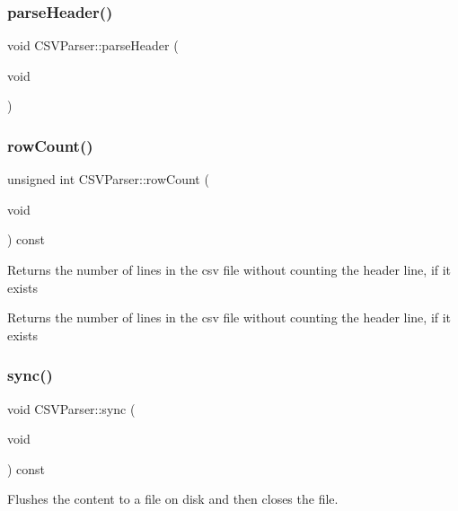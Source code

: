\mbox{\label{class_c_s_v_parser_a8b556e47ecfea188d4c6c630616f5667}} 
\subsubsection{\texorpdfstring{parseHeader()}{parseHeader()}}
{\footnotesize\ttfamily void C\+S\+V\+Parser\+::parse\+Header (\begin{DoxyParamCaption}\item[{void}]{ }\end{DoxyParamCaption})\hspace{0.3cm}{\ttfamily [protected]}}

\mbox{\label{class_c_s_v_parser_ab7596d8458539a585908d41638672f4c}} 
\subsubsection{\texorpdfstring{rowCount()}{rowCount()}}
{\footnotesize\ttfamily unsigned int C\+S\+V\+Parser\+::row\+Count (\begin{DoxyParamCaption}\item[{void}]{ }\end{DoxyParamCaption}) const}

Returns the number of lines in the csv file without counting the header line, if it exists \begin{DoxyReturn}{Returns}
the number of lines in the csv file without counting the header line, if it exists 
\end{DoxyReturn}
\mbox{\label{class_c_s_v_parser_aa0b2494094eb2ce657787ae830b3cc52}} 
\subsubsection{\texorpdfstring{sync()}{sync()}}
{\footnotesize\ttfamily void C\+S\+V\+Parser\+::sync (\begin{DoxyParamCaption}\item[{void}]{ }\end{DoxyParamCaption}) const}

Flushes the content to a file on disk and then closes the file. 

